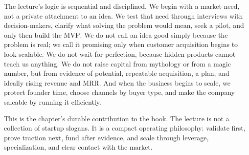 The lecture's logic is sequential and disciplined. We begin with a market need, not a private attachment to an idea. We test that need through interviews with decision-makers, clarify what solving the problem would mean, seek a pilot, and only then build the \(\mathrm{MVP}\). We do not call an idea good simply because the problem is real; we call it promising only when customer acquisition begins to look scalable. We do not wait for perfection, because hidden products cannot teach us anything. We do not raise capital from mythology or from a magic number, but from evidence of potential, repeatable acquisition, a plan, and ideally rising revenue and \(\mathrm{MRR}\). And when the business begins to scale, we protect founder time, choose channels by buyer type, and make the company saleable by running it efficiently.

This is the chapter's durable contribution to the book. The lecture is not a collection of startup slogans. It is a compact operating philosophy: validate first, prove traction next, fund after evidence, and scale through leverage, specialization, and clear contact with the market.